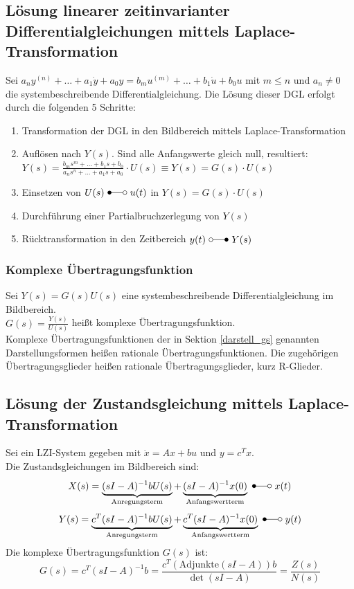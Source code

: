 \documentclass[10pt,a4paper]{article}
\begin{document}
\subsection{Lösung linearer zeitinvarianter Differentialgleichungen mittels Laplace-Transformation}
Sei $a_ny^{(n)} + \dots + a_1 \dot y + a_0 y = b_m u^{(m)} + \dots + b_1 \dot u + b_0 u$ mit $m ≤ n$ und $a_n ≠ 0$ die systembeschreibende Differentialgleichung.
Die Lösung dieser DGL erfolgt durch die folgenden 5 Schritte:
\begin{enumerate}
	\item Transformation der DGL in den Bildbereich mittels Laplace-Transformation
	\item Auflösen nach $Y(s)$. Sind alle Anfangswerte gleich null, resultiert: \\
	$Y(s) = \frac{b_ms^m + \dots + b_1s + b_0}{a_ns^n + \dots + a_1s + a_0} ⋅ U(s) ≡ Y(s) = G(s) ⋅ U(s)$
	\item Einsetzen von $U(s) ~\Laplace ~u(t)$ in $Y(s) = G(s) ⋅ U(s)$
	\item Durchführung einer Partialbruchzerlegung von $Y(s)$
	\item Rücktransformation in den Zeitbereich $y(t) ~\laplace ~Y(s)$
\end{enumerate}

\subsubsection{Komplexe Übertragungsfunktion}
Sei $Y(s) = G(s)U(s)$ eine systembeschreibende Differentialgleichung im Bildbereich. \\
$G(s) = \frac{Y(s)}{U(s)}$ heißt komplexe Übertragungsfunktion. \\
Komplexe Übertragungsfunktionen der in Sektion \ref{darstell_gs} genannten Darstellungsformen heißen rationale Übertragungsfunktionen. Die zugehörigen Übertragungsglieder heißen rationale Übertragungsglieder, kurz R-Glieder.

\subsection{Lösung der Zustandsgleichung mittels Laplace-Transformation}
Sei ein LZI-System gegeben mit $\dot x = Ax + bu$ und $y = c^T x$. \\
Die Zustandsgleichungen im Bildbereich sind:
$$
	X(s) = \underbrace{(sI-A)^{-1} b U(s)}_{\text{Anregungsterm}} + \underbrace{(sI-A)^{-1} x(0)}_{\text{Anfangswertterm}} ~\Laplace ~x(t)
$$
$$
	Y(s) = \underbrace{c^T(sI-A)^{-1} b U(s)}_{\text{Anregungsterm}} + \underbrace{c^T (sI - A)^{-1} x(0)}_{\text{Anfangswertterm}} ~\Laplace ~y(t)
$$
Die komplexe Übertragungsfunktion $G(s)$ ist:
$$
	G(s) = c^T(sI - A)^{-1} b = \frac{c^T(\textrm{Adjunkte}(sI-A))b}{\det(sI-A)} = \frac{Z(s)}{N(s)}
$$
\end{document}
